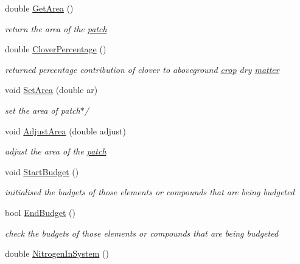 \begin{DoxyCompactItemize}
double \hyperlink{classpatch_ae5ed6219bcd53dc67ca0dbbf33109649}{GetArea} ()
\begin{DoxyCompactList}\small\item\em return the area of the \hyperlink{classpatch}{patch} \item\end{DoxyCompactList}\item 
double \hyperlink{classpatch_af461c06a42b72cd9a26f452a0d583458}{CloverPercentage} ()
\begin{DoxyCompactList}\small\item\em returned percentage contribution of clover to aboveground \hyperlink{classcrop}{crop} dry \hyperlink{classmatter}{matter} \item\end{DoxyCompactList}\item 
void \hyperlink{classpatch_aa6e819a227c7d5aeceda53afad1de51f}{SetArea} (double ar)
\begin{DoxyCompactList}\small\item\em set the area of patch$\ast$/ \item\end{DoxyCompactList}\item 
void \hyperlink{classpatch_a4258aa2c074432be7603578ac1397e26}{AdjustArea} (double adjust)
\begin{DoxyCompactList}\small\item\em adjust the area of the \hyperlink{classpatch}{patch} \item\end{DoxyCompactList}\item 
void \hyperlink{classpatch_a16276b251ebd3f27715ea21be08dfa68}{StartBudget} ()
\begin{DoxyCompactList}\small\item\em initialised the budgets of those elements or compounds that are being budgeted \item\end{DoxyCompactList}\item 
bool \hyperlink{classpatch_a081e88d1eef85a499e8f466dbe0bf546}{EndBudget} ()
\begin{DoxyCompactList}\small\item\em check the budgets of those elements or compounds that are being budgeted \item\end{DoxyCompactList}\item 
double \hyperlink{classpatch_a9c12288512a19b8e44eb15f532f34a4d}{NitrogenInSystem} ()

\end{DoxyCompactItemize}

